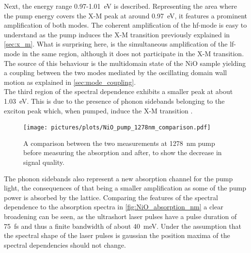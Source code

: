 Next, the energy range 0.97-\qty{1.01}{eV} is described.
Representing the area where the pump energy covers the X-M peak at around \qty{0.97}{eV},
it features a prominent amplification of both modes.
The coherent amplification of the hf-mode is easy to understand as the pump induces the X-M transition previously explained in \autoref{sec:x_m}.
What is surprising here, is the simultaneous amplification of the lf-mode in the same region, although it does not participate in the X-M transition.
The source of this behaviour is the multidomain state of the NiO sample yielding a coupling between the two modes mediated by the oscillating domain wall motion as explained in \autoref{sec:mode_coupling}. \\
The third region of the spectral dependence exhibits a smaller peak at about \qty{1.03}{eV}.
This is due to the presence of phonon sidebands belonging to the exciton peak which, when pumped, induce the X-M transition \cite{bossini_ultrafast_2021}.
\begin{figure}[ht]
    \centering
    \texttt{[image: pictures/plots/NiO\_pump\_1278nm\_comparison.pdf]}
    \caption{A comparison between the two measurements at \qty{1278}{nm} pump before measuring the absorption and after, to show the decrease in signal quality.}
    \label{fig:NiO_pump_1278nm_comparison}
\end{figure}
\FloatBarrier
The phonon sidebands also represent a new absorption channel for the pump light, the consequences of that being a smaller amplification as some of the pump power is absorbed by the lattice.
Comparing the features of the spectral dependence to the absorption spectra in \autoref{fig:NiO_absorption_nm} a clear broadening can be seen, as the ultrashort laser pulses have a pulse duration of \qty{75}{fs} and thus a finite bandwidth of about \qty{40}{meV}.
Under the assumption that the spectral shape of the laser pulses is gaussian the position maxima of the spectral dependencies should not change.

